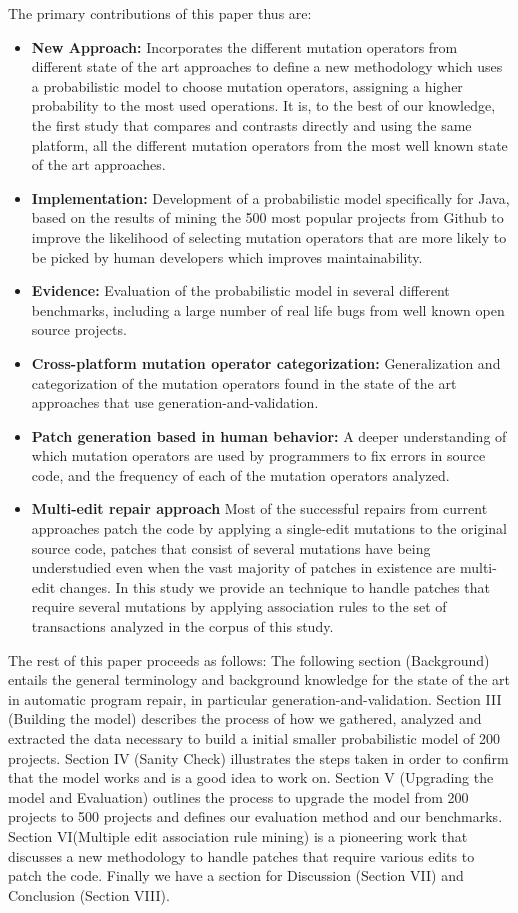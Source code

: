 \documentclass[conference]{IEEEtran}
\begin{document}
The primary contributions of this paper thus are:
\begin{itemize}
  \item \textbf{New Approach:} Incorporates the different mutation operators from different state of the art approaches to define a new methodology which uses a probabilistic model to choose mutation operators, assigning a higher probability to the most used operations. It is, to the best of our knowledge, the first study that compares and contrasts directly and using the same platform, all the different mutation operators from the most well known state of the art approaches. 
  \item \textbf{Implementation:} Development of a probabilistic model specifically for Java, based on the results of mining the 500 most popular projects from Github to improve the likelihood of selecting mutation operators that are more likely to be picked by human developers which improves maintainability.
  \item \textbf{Evidence:} Evaluation of the probabilistic model in several different benchmarks, including a large number of real life bugs from well known open source projects.
  \item \textbf{Cross-platform mutation operator categorization:} Generalization and categorization of the mutation operators found in the state of the art approaches that use generation-and-validation.
  \item \textbf{Patch generation based in human behavior:} A deeper understanding of which mutation operators are used by programmers to fix errors in source code, and the frequency of each of the mutation operators analyzed.
  \item \textbf{Multi-edit repair approach} Most of the successful repairs from current approaches patch the code by applying a single-edit mutations to the original source code, patches that consist of several mutations have being understudied even when the vast majority of patches in existence are multi-edit changes. In this study we provide an technique to handle patches that require several mutations by applying association rules to the set of transactions analyzed in the corpus of this study.  
\end{itemize}

The rest of this paper proceeds as follows:
The following section (Background) entails the general terminology and background knowledge for the state of the art in automatic program repair, in particular generation-and-validation. Section III (Building the model) describes the process of how we gathered, analyzed and extracted the data necessary to build a initial smaller probabilistic model of 200 projects. Section IV (Sanity Check) illustrates the steps taken in order to confirm that the model works and is a good idea to work on. Section V (Upgrading the model and Evaluation) outlines the process to upgrade the model from 200 projects to 500 projects and defines our evaluation method and our benchmarks. Section VI(Multiple edit association rule mining) is a pioneering work that discusses a new methodology to handle patches that require various edits to patch the code. Finally we have a section for Discussion (Section VII) and Conclusion (Section VIII).
\end{document}
